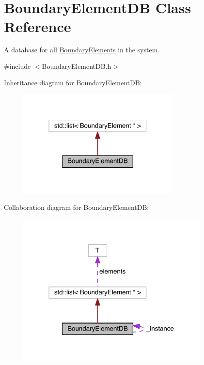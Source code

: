 \hypertarget{classBoundaryElementDB}{\section{Boundary\+Element\+D\+B Class Reference}
\label{classBoundaryElementDB}
}


A database for all \hyperlink{classBoundaryElement}{Boundary\+Elements} in the system.  




{\ttfamily \#include $<$Boundary\+Element\+D\+B.\+h$>$}



Inheritance diagram for Boundary\+Element\+D\+B\+:\nopagebreak
\begin{figure}[H]
\begin{center}
\leavevmode
\includegraphics[width=231pt]{classBoundaryElementDB__inherit__graph}
\end{center}
\end{figure}


Collaboration diagram for Boundary\+Element\+D\+B\+:\nopagebreak
\begin{figure}[H]
\begin{center}
\leavevmode
\includegraphics[width=274pt]{classBoundaryElementDB__coll__graph}
\end{center}
\end{figure}
